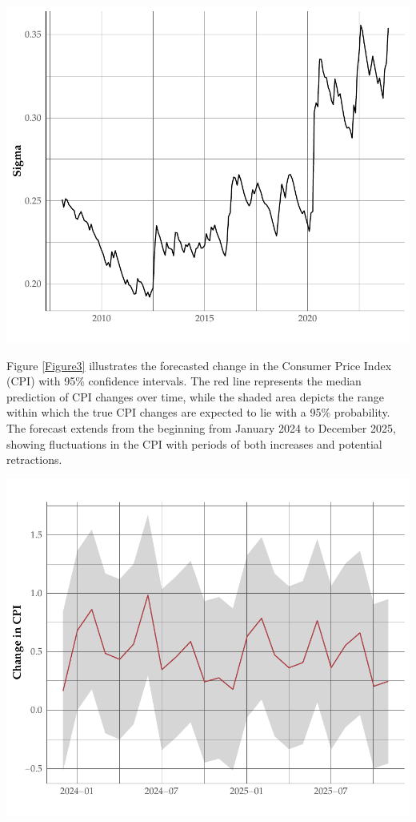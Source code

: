 \documentclass[11pt,preprint, authoryear]{elsarticle}
\let\origfigure\figure
\let\endorigfigure\endfigure
\renewenvironment{figure}[1][2] {
    \expandafter\origfigure\expandafter[H]
} {
    \endorigfigure
}
\numberwithin{equation}{section}
\numberwithin{figure}{section}
\numberwithin{table}{section}
\begin{document}
\begin{figure}
\centering
\includegraphics{FMX-Proj-Write_Up_files/figure-latex/sigma_plot-1.pdf}
\caption{GARCH Model Conditional Volatility (Sigma) Over Time
\label{Figure2}}
\end{figure}

Figure \ref{Figure3} illustrates the forecasted change in the Consumer
Price Index (CPI) with 95\% confidence intervals. The red line
represents the median prediction of CPI changes over time, while the
shaded area depicts the range within which the true CPI changes are
expected to lie with a 95\% probability. The forecast extends from the
beginning from January 2024 to December 2025, showing fluctuations in
the CPI with periods of both increases and potential retractions.

\begin{figure}
\centering
\includegraphics{FMX-Proj-Write_Up_files/figure-latex/plot_forecast-1.pdf}
\caption{Forecasted change in CPI (with 95\% Confidence Intervals)
\label{Figure3}}
\end{figure}
\end{document}
